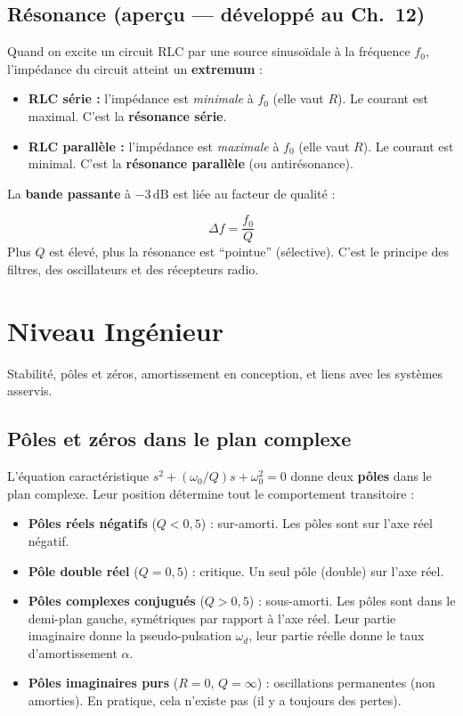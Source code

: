 \documentclass[12pt,a4paper,twoside]{book}
\begin{document}
\subsection{Résonance (aperçu --- développé au Ch.\ 12)}

Quand on excite un circuit RLC par une source sinusoïdale à la fréquence $f_0$, l'impédance du circuit atteint un \textbf{extremum} :
\begin{itemize}[nosep]
\item \textbf{RLC série :} l'impédance est \textit{minimale} à $f_0$ (elle vaut $R$). Le courant est maximal. C'est la \textbf{résonance série}.
\item \textbf{RLC parallèle :} l'impédance est \textit{maximale} à $f_0$ (elle vaut $R$). Le courant est minimal. C'est la \textbf{résonance parallèle} (ou antirésonance).
\end{itemize}

La \textbf{bande passante} à $-3\,\text{dB}$ est liée au facteur de qualité :
\begin{formule}
\[
\boxed{\Delta f = \frac{f_0}{Q}}
\]
Plus $Q$ est élevé, plus la résonance est ``pointue'' (sélective). C'est le principe des filtres, des oscillateurs et des récepteurs radio.
\end{formule}

\section{Niveau Ingénieur}

\begin{ingenieur}
Stabilité, pôles et zéros, amortissement en conception, et liens avec les systèmes asservis.
\end{ingenieur}

\subsection{Pôles et zéros dans le plan complexe}

L'équation caractéristique $s^2 + (\omega_0/Q)s + \omega_0^2 = 0$ donne deux \textbf{pôles} dans le plan complexe. Leur position détermine tout le comportement transitoire :

\begin{itemize}[nosep]
\item \textbf{Pôles réels négatifs} ($Q < 0{,}5$) : sur-amorti. Les pôles sont sur l'axe réel négatif.
\item \textbf{Pôle double réel} ($Q = 0{,}5$) : critique. Un seul pôle (double) sur l'axe réel.
\item \textbf{Pôles complexes conjugués} ($Q > 0{,}5$) : sous-amorti. Les pôles sont dans le demi-plan gauche, symétriques par rapport à l'axe réel. Leur partie imaginaire donne la pseudo-pulsation $\omega_d$, leur partie réelle donne le taux d'amortissement $\alpha$.
\item \textbf{Pôles imaginaires purs} ($R = 0$, $Q = \infty$) : oscillations permanentes (non amorties). En pratique, cela n'existe pas (il y a toujours des pertes).
\end{itemize}
\end{document}
